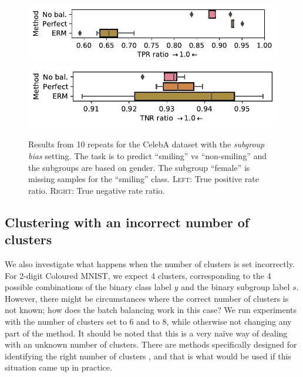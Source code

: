 \begin{figure}[htp]
  \centering
  \includegraphics[width=\columnwidth]{paper3/figures/celeba_gender_smiling_tprr.pdf}
  \includegraphics[width=\columnwidth]{paper3/figures/celeba_gender_smiling_tnrr.pdf}
  \caption{
    Results from 10 repeats for the CelebA dataset with the \emph{subgroup bias} setting.
    The task is to predict ``smiling'' vs ``non-smiling'' and the subgroups are based on gender.
    The subgroup ``female'' is missing samples for the ``smiling'' class.
    \textsc{Left}: True positive rate ratio.
    \textsc{Right}: True negative rate ratio.
  }%
  \label{fig:celeba-gender-smiling-add}
\end{figure}

\subsection{Clustering with an incorrect number of clusters}\label{sec:overclustering}
We also investigate what happens when the number of clusters is set incorrectly.
For 2-digit Coloured MNIST, we expect 4 clusters, corresponding to the 4 possible combinations of the binary class label $y$ and the binary subgroup label $s$.
However, there might be circumstances where the correct number of clusters is not known; how does the batch balancing work in this case?
We run experiments with the number of clusters set to 6 and to 8, while otherwise not changing any part of the method.
It should be noted that this is a very na\"ive way of dealing with an unknown number of clusters.
There are methods specifically designed for identifying the right number of clusters \citep{hamerly2004learning,chazal2013persistence},
and that is what would be used if this situation came up in practice.

